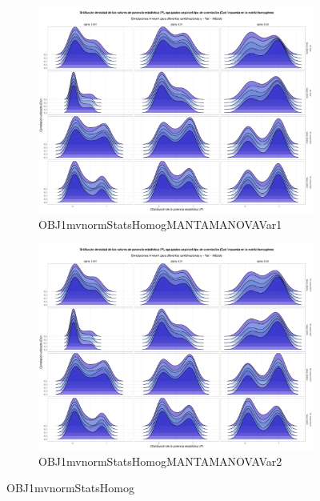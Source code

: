 \documentclass[IB,BIB]{TFUOC}%
\begin{document}
\begin{figure}
\begin{subfigure}{0.49\textwidth}
\centering
\includegraphics[width = \textwidth]{OBJ1mvnormStatsHomogMANTAMANOVAVar1.pdf}
\caption{OBJ1mvnormStatsHomogMANTAMANOVAVar1}
\label{fig:OBJ1mvnormStatsHomogMANTAMANOVAVar1}
\end{subfigure}
\begin{subfigure}{0.49\textwidth}
\centering
\includegraphics[width = \textwidth]{OBJ1mvnormStatsHomogMANTAMANOVAVar2.pdf}
\caption{OBJ1mvnormStatsHomogMANTAMANOVAVar2}
\label{fig:OBJ1mvnormStatsHomogMANTAMANOVAVar2}
\end{subfigure}
\caption{OBJ1mvnormStatsHomog}
\label{fig:OBJ1mvnormStatsHomog}
\end{figure}
\end{document}
